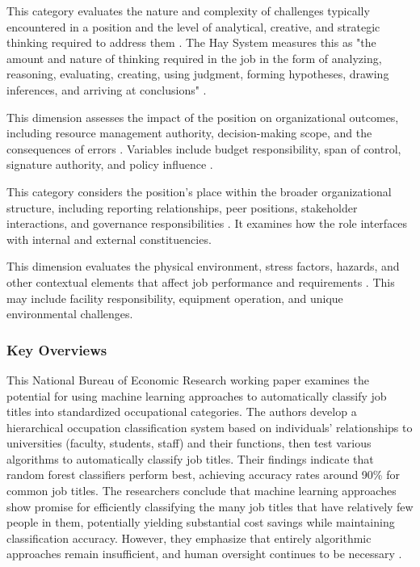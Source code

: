 \documentclass[../main.tex]{subfiles}
\begin{document}
This category evaluates the nature and complexity of challenges typically encountered in a position and the level of analytical, creative, and strategic thinking required to address them \parencite{peoplebox2024,synergogy2024}. The Hay System measures this as "the amount and nature of thinking required in the job in the form of analyzing, reasoning, evaluating, creating, using judgment, forming hypotheses, drawing inferences, and arriving at conclusions" \parencite{waterloo2024}.

This dimension assesses the impact of the position on organizational outcomes, including resource management authority, decision-making scope, and the consequences of errors \parencite{deel2024,peoplebox2024}. Variables include budget responsibility, span of control, signature authority, and policy influence \parencite{wm2024}.

This category considers the position's place within the broader organizational structure, including reporting relationships, peer positions, stakeholder interactions, and governance responsibilities \parencite{wm2024}. It examines how the role interfaces with internal and external constituencies.

This dimension evaluates the physical environment, stress factors, hazards, and other contextual elements that affect job performance and requirements \parencite{synergogy2024}. This may include facility responsibility, equipment operation, and unique environmental challenges.

\subsubsection{Key Overviews}

This National Bureau of Economic Research working paper examines the potential for using machine learning approaches to automatically classify job titles into standardized occupational categories. The authors develop a hierarchical occupation classification system based on individuals' relationships to universities (faculty, students, staff) and their functions, then test various algorithms to automatically classify job titles. Their findings indicate that random forest classifiers perform best, achieving accuracy rates around 90\% for common job titles. The researchers conclude that machine learning approaches show promise for efficiently classifying the many job titles that have relatively few people in them, potentially yielding substantial cost savings while maintaining classification accuracy. However, they emphasize that entirely algorithmic approaches remain insufficient, and human oversight continues to be necessary \parencite{ikudo2018}.
\end{document}
